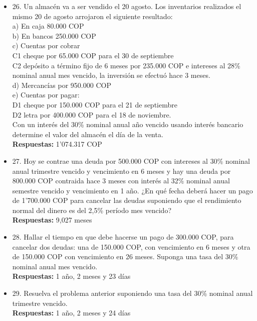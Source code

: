 \begin{itemize}
 \item 26. Un almacén va a ser vendido el 20 agosto. Los inventarios realizados el mismo 20 de agosto arrojaron el siguiente resultado:\\

       a)	En caja 80.000 COP\\
       b)	En bancos 250.000 COP\\
       c)	Cuentas por cobrar \\
       C1 cheque por 65.000 COP para el 30 de septiembre\\
       C2 depósito a término fijo de 6 meses por 235.000 COP e intereses al 28\% nominal anual mes vencido, la inversión se efectuó hace 3 meses.\\
       d)	Mercancías por 950.000 COP\\
       e)	Cuentas por pagar:\\
       D1 cheque por 150.000 COP para el 21 de septiembre\\
       D2 letra por 400.000 COP para el 18 de noviembre.\\

       Con un interés del 30\% nominal anual año vencido usando interés bancario determine el valor del almacén el día de la venta.\\
       \textbf{Respuestas:} 1'074.317 COP
       \medskip

 \item 27. Hoy se contrae una deuda por 500.000 COP con intereses al 30\% nominal anual trimestre vencido y vencimiento en 6 meses y hay una deuda por 800.000 COP contraida hace 3 meses con interés al 32\% nominal anual semestre vencido y vencimiento en 1 año. ¿En qué fecha deberá hacer un pago de 1'700.000 COP para cancelar las deudas suponiendo que el rendimiento normal del dinero es del 2,5\% período mes vencido?\\
       \textbf{ Respuestas:} 9,027 meses
       \medskip

 \item 28. Hallar el tiempo en que debe hacerse un pago de 300.000 COP, para cancelar dos deudas: una de 150.000 COP, con vencimiento en 6 meses y  otra de 150.000 COP con vencimiento en 26 meses. Suponga una tasa del 30\% nominal anual mes vencido.\\
       \textbf{Respuestas:} 1 año, 2 meses y 23 días
       \medskip

 \item 29. Resuelva el problema anterior suponiendo una tasa del 30\% nominal anual trimestre vencido.\\
       \textbf{Respuestas:} 1 año, 2 meses y 24 días
       \medskip


\end{itemize}
